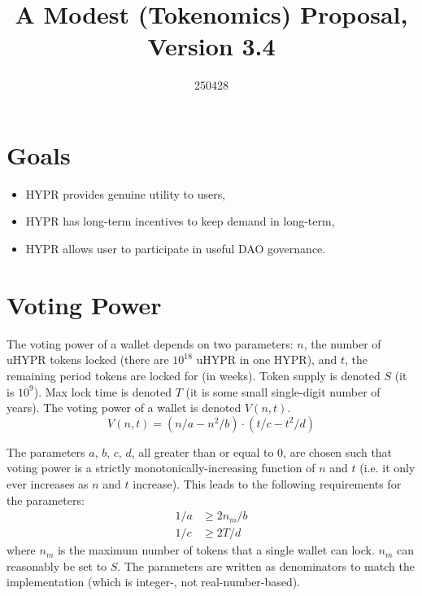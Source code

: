 \documentclass{article}
\title{A Modest (Tokenomics) Proposal, Version 3.4}
\date{250428}
\author{}
\begin{document}
\maketitle

\section{Goals}\label{sec:goals}
\begin{itemize}
    \item HYPR provides genuine utility to users,
    \item HYPR has long-term incentives to keep demand in long-term,
    \item HYPR allows user to participate in useful DAO governance.
\end{itemize}

\section{Voting Power}\label{sec:votingpower}

The voting power of a wallet depends on two parameters: $n$, the number of uHYPR tokens locked (there are $10^{18}$ uHYPR in one HYPR), and $t$, the remaining period tokens are locked for (in weeks).
Token supply is denoted $S$ (it is $10^9$).
Max lock time is denoted $T$ (it is some small single-digit number of years).
The voting power of a wallet is denoted $V(n, t)$.
\begin{equation}
V(n, t) = (n/a - n^2/b) \cdot (t/c - t^2/d)
\end{equation}

The parameters $a$, $b$, $c$, $d$, all greater than or equal to $0$, are chosen such that voting power is a strictly monotonically-increasing function of $n$ and $t$ (i.e. it only ever increases as $n$ and $t$ increase).
This leads to the following requirements for the parameters:
\begin{equation}\label{eq:parameters-extremum}
\begin{aligned}
1/a &\geq 2 n_m / b\\
1/c &\geq 2 T / d
\end{aligned}
\end{equation}
where $n_m$ is the maximum number of tokens that a single wallet can lock.
$n_m$ can reasonably be set to $S$.
The parameters are written as denominators to match the implementation (which is integer-, not real-number-based).
\end{document}
